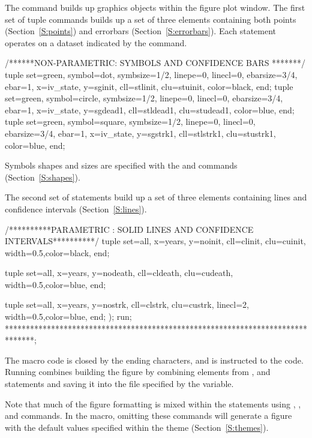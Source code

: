 \documentclass[nojss]{jss}\usepackage[]{graphicx}\usepackage[]{color}
\begin{document}
The  command builds up graphics objects within the figure plot window. The first set of tuple commands builds up a set of three elements containing both points (Section~\ref{S:points}) and errorbars (Section~\ref{S:errorbars}). Each  statement operates on a dataset indicated by the  command. 
\begin{CodeChunk}\small
\begin{CodeInput}
/******NON-PARAMETRIC: SYMBOLS AND CONFIDENCE BARS *******/
tuple set=green, symbol=dot, symbsize=1/2, linepe=0, linecl=0,
ebarsize=3/4, ebar=1,
x=iv_state, y=sginit, cll=stlinit, clu=stuinit, color=black, 
end;
tuple set=green, symbol=circle, symbsize=1/2, linepe=0, linecl=0,
ebarsize=3/4, ebar=1,
x=iv_state, y=sgdead1, cll=stldead1, clu=studead1, color=blue, 
end;
tuple set=green, symbol=square, symbsize=1/2, linepe=0, linecl=0,
ebarsize=3/4, ebar=1,
x=iv_state, y=sgstrk1, cll=stlstrk1, clu=stustrk1, color=blue, 
end;
\end{CodeInput}
\end{CodeChunk}
Symbols shapes and sizes are specified with the  and  commands (Section~\ref{S:shapes}).

The second set of  statements build up a set of three elements containing lines and confidence intervals (Section~\ref{S:lines}).
\begin{CodeChunk}\small
\begin{CodeInput}

/**********PARAMETRIC : SOLID LINES AND CONFIDENCE INTERVALS**********/      
tuple set=all, x=years, y=noinit, cll=clinit, clu=cuinit,
width=0.5,color=black, 
end;

tuple set=all, x=years, y=nodeath, cll=cldeath, clu=cudeath,
width=0.5,color=blue, 
end;

tuple set=all, x=years, y=nostrk, cll=clstrk, clu=custrk,
linecl=2, width=0.5,color=blue, 
end;
);
run;
*******************************************************************************;
\end{CodeInput}
\end{CodeChunk}

The  macro code is closed by the ending \code{);} characters, and  is instructed to  the code. Running combines building the figure by combining elements from ,  and  statements and saving it into the file specified by the  variable. 

Note that much of the figure formatting is mixed within the  statements using , ,  and  commands. In the  macro, omitting these commands will generate a figure with the default values specified within the  theme (Section~\ref{S:themes}).
\end{document}
